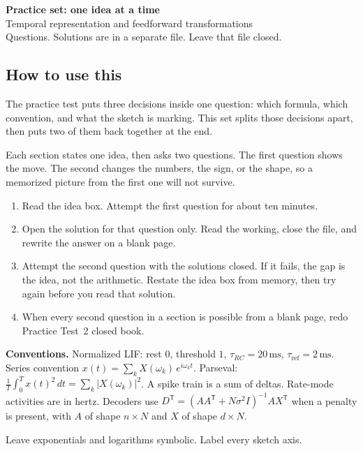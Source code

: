 \documentclass[11pt,letterpaper]{article}
\newcommand{\T}{\mathsf{T}}
\newcommand{\tref}{\tau_{\mathrm{ref}}}
\newcommand{\trc}{\tau_{RC}}
\begin{document}
\begin{center}
{\Large\bfseries Practice set: one idea at a time}\\[2pt]
{\large Temporal representation and feedforward transformations}\\[4pt]
{\normalsize Questions. Solutions are in a separate file. Leave that file closed.}
\end{center}

\subsection*{How to use this}

The practice test puts three decisions inside one question: which formula, which convention, and what the sketch is marking. This set splits those decisions apart, then puts two of them back together at the end.

Each section states one idea, then asks two questions. The first question shows the move. The second changes the numbers, the sign, or the shape, so a memorized picture from the first one will not survive.

\begin{enumerate}[leftmargin=1.4em]
\item Read the idea box. Attempt the first question for about ten minutes.
\item Open the solution for that question only. Read the working, close the file, and rewrite the answer on a blank page.
\item Attempt the second question with the solutions closed. If it fails, the gap is the idea, not the arithmetic. Restate the idea box from memory, then try again before you read that solution.
\item When every second question in a section is possible from a blank page, redo Practice Test~2 closed book.
\end{enumerate}

\textbf{Conventions.} Normalized LIF: rest $0$, threshold $1$, $\trc = 20\,\mathrm{ms}$, $\tref = 2\,\mathrm{ms}$. Series convention $x(t) = \sum_k X(\omega_k)\, e^{i\omega_k t}$. Parseval: $\frac{1}{T}\int_0^T x(t)^2\,dt = \sum_k |X(\omega_k)|^2$. A spike train is a sum of deltas. Rate-mode activities are in hertz. Decoders use $D^{\T} = (AA^{\T} + N\sigma^2 I)^{-1}AX^{\T}$ when a penalty is present, with $A$ of shape $n \times N$ and $X$ of shape $d \times N$.

Leave exponentials and logarithms symbolic. Label every sketch axis.
\end{document}
